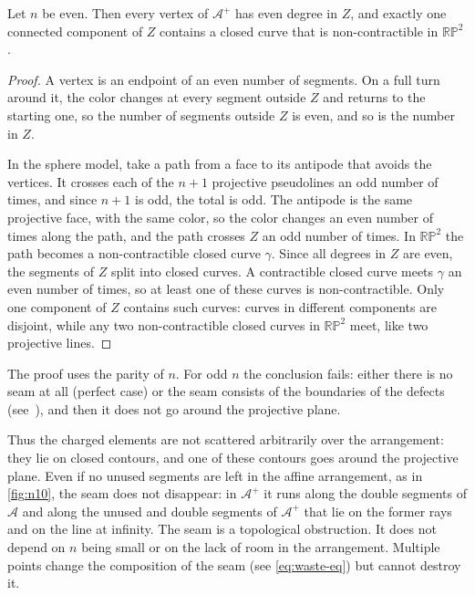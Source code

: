\begin{lemma}\label{lem:seam}
Let $n$ be even. Then every vertex of $\mathcal A^+$ has even degree in $Z$, and exactly one connected component of $Z$ contains a closed curve that is non-contractible in $\mathbb{RP}^2$.
\end{lemma}

\begin{proof}
A vertex is an endpoint of an even number of segments. On a full turn around it, the color changes at every segment outside $Z$ and returns to the starting one, so the number of segments outside $Z$ is even, and so is the number in $Z$.

In the sphere model, take a path from a face to its antipode that avoids the vertices. It crosses each of the $n+1$ projective pseudolines an odd number of times, and since $n+1$ is odd, the total is odd. The antipode is the same projective face, with the same color, so the color changes an even number of times along the path, and the path crosses $Z$ an odd number of times.
In $\mathbb{RP}^2$ the path becomes a non-contractible closed curve $\gamma$. Since all degrees in $Z$ are even, the segments of $Z$ split into closed curves. A contractible closed curve meets $\gamma$ an even number of times, so at least one of these curves is non-contractible.
Only one component of $Z$ contains such curves: curves in different components are disjoint, while any two non-contractible closed curves in $\mathbb{RP}^2$ meet, like two projective lines.
\end{proof}

The proof uses the parity of $n$. For odd $n$ the conclusion fails: either there is no seam at all (perfect case) or the seam consists of the boundaries of the defects (see~\cite[Subsection~2.5]{pu26b}), and then it does not go around the projective plane.

Thus the charged elements are not scattered arbitrarily over the arrangement: they lie on closed contours, and one of these contours goes around the projective plane.
Even if no unused segments are left in the affine arrangement, as in \cref{fig:n10}, the seam does not disappear: in $\mathcal A^+$ it runs along the double segments of $\mathcal A$ and along the unused and double segments of $\mathcal A^+$ that lie on the former rays and on the line at infinity.
The seam is a topological obstruction. It does not depend on $n$ being small or on the lack of room in the arrangement. Multiple points change the composition of the seam (see \eqref{eq:waste-eq}) but cannot destroy it.

